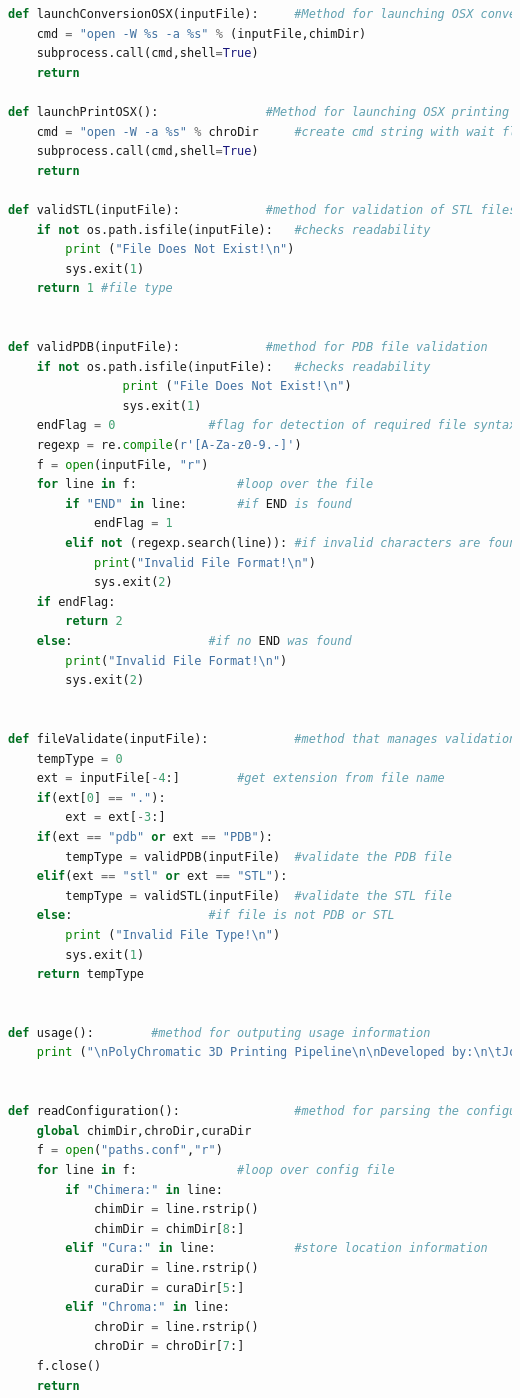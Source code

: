 \documentclass[letterpaper, onecolumn, draftclsnofoot, 10pt, compsoc]{IEEEtran}
\begin{document}
\begin{singlespace}
\begin{lstlisting}[language=Python]
def launchConversionOSX(inputFile):		#Method for launching OSX conversion software
	cmd = "open -W %s -a %s" % (inputFile,chimDir)
	subprocess.call(cmd,shell=True)
	return

def launchPrintOSX():				#Method for launching OSX printing software
	cmd = "open -W -a %s" % chroDir		#create cmd string with wait flag to hold execution
	subprocess.call(cmd,shell=True)
	return
	
def validSTL(inputFile):			#method for validation of STL files
	if not os.path.isfile(inputFile):	#checks readability
		print ("File Does Not Exist!\n")	
		sys.exit(1)
	return 1 #file type


def validPDB(inputFile):			#method for PDB file validation
	if not os.path.isfile(inputFile):	#checks readability
                print ("File Does Not Exist!\n")
                sys.exit(1)
	endFlag = 0				#flag for detection of required file syntax
	regexp = re.compile(r'[A-Za-z0-9.-]')
	f = open(inputFile, "r")
	for line in f:				#loop over the file
		if "END" in line:		#if END is found
			endFlag = 1
		elif not (regexp.search(line)):	#if invalid characters are found
			print("Invalid File Format!\n")
			sys.exit(2)
	if endFlag:
		return 2
	else:					#if no END was found
		print("Invalid File Format!\n")
		sys.exit(2)


def fileValidate(inputFile):			#method that manages validation
	tempType = 0
	ext = inputFile[-4:]		#get extension from file name
	if(ext[0] == "."):
		ext = ext[-3:]
	if(ext == "pdb" or ext == "PDB"):
		tempType = validPDB(inputFile)	#validate the PDB file
	elif(ext == "stl" or ext == "STL"):
		tempType = validSTL(inputFile)  #validate the STL file
	else:					#if file is not PDB or STL
		print ("Invalid File Type!\n")
		sys.exit(1)
	return tempType


def usage():		#method for outputing usage information
	print ("\nPolyChromatic 3D Printing Pipeline\n\nDeveloped by:\n\tJoshua Lioy, Corynna Park, Jackson Wells\n\nUsage:\n\tpython polyPipeline.py [Optional Flags] [-w or -m]  -i [input file]\n\nFlags:\n\t-h\tdisplayes usage\n\t-i\tto input file\n\t-v\tfor verbose program output\n\t-w\tsets operating system to Windows\n\t-m\tsets operating system to OSX\n\n")


def readConfiguration():				#method for parsing the configuration file
	global chimDir,chroDir,curaDir		
	f = open("paths.conf","r") 
	for line in f:				#loop over config file
		if "Chimera:" in line:	
			chimDir = line.rstrip()
			chimDir = chimDir[8:]
		elif "Cura:" in line:			#store location information
			curaDir = line.rstrip()
			curaDir = curaDir[5:]	
		elif "Chroma:" in line:	
			chroDir = line.rstrip()
			chroDir = chroDir[7:]		
	f.close()
	return



\end{lstlisting}
\end{singlespace}
\end{document}
